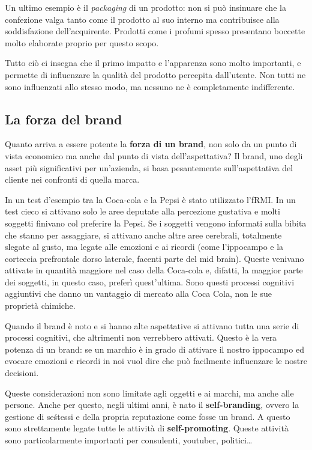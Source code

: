 Un ultimo esempio è il \emph{packaging} di un prodotto: non si può insinuare
che la confezione valga tanto come il prodotto al suo interno ma contribuisce
alla soddisfazione dell'acquirente. Prodotti come i profumi spesso presentano
boccette molto elaborate proprio per questo scopo.

Tutto ciò ci insegna che il primo impatto e l'apparenza sono molto importanti,
e permette di influenzare la qualità del prodotto percepita dall'utente. Non
tutti ne sono influenzati allo stesso modo, ma nessuno ne è completamente
indifferente.

\subsection{La forza del brand}

Quanto arriva a essere potente la \textbf{forza di un brand}, non solo da un
punto di vista economico ma anche dal punto di vista dell'aspettativa?
Il brand, uno degli asset più significativi per un'azienda, si basa
pesantemente sull'aspettativa del cliente nei confronti di quella marca.

In un test d'esempio tra la Coca-cola e la Pepsi è stato utilizzato l'fRMI. In
un test cieco si attivano solo le aree deputate alla percezione gustativa e
molti soggetti finivano col preferire la Pepsi. Se i soggetti vengono
informati sulla bibita che stanno per assaggiare, si attivano anche altre
aree cerebrali, totalmente slegate al gusto, ma legate alle emozioni e ai
ricordi (come l'ippocampo e la corteccia prefrontale dorso laterale, facenti
parte del mid brain). Queste venivano attivate in quantità maggiore nel caso
della Coca-cola e, difatti, la maggior parte dei soggetti, in questo caso,
preferì quest'ultima. Sono questi processi cognitivi aggiuntivi che danno un
vantaggio di mercato alla Coca Cola, non le sue proprietà chimiche.

Quando il brand è noto e si hanno alte aspettative si attivano tutta una serie
di processi cognitivi, che altrimenti non verrebbero attivati. Questo è la vera
potenza di un brand: se un marchio è in grado di attivare il nostro ippocampo
ed evocare emozioni e ricordi in noi vuol dire che può facilmente influenzare
le nostre decisioni.

Queste considerazioni non sono limitate agli oggetti e ai marchi, ma anche alle
persone. Anche per questo, negli ultimi anni, è nato il \textbf{self-branding},
ovvero la gestione di se\' stessi e della propria reputazione come fosse un
brand. A questo sono strettamente legate tutte le attività di
\textbf{self-promoting}. Queste attività
sono particolarmente importanti per consulenti, youtuber, politici\dots{}

